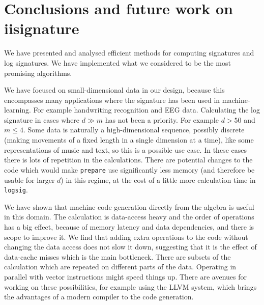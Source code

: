 \section{Conclusions and future work on iisignature}
\label{sec:iisigConcl}

We have presented and analysed efficient methods for computing signatures and log signatures. %
We have implemented what we considered to be the most promising algorithms.

We have focused on small-dimensional data in our design, because this encompasses many applications where the signature has been used in machine-learning. For example handwriting recognition and EEG data.
Calculating the log signature in cases where $d\gg m$ has not been a priority. For example $d>50$ and $m\le4$. Some data is naturally a high-dimensional sequence, possibly discrete (making movements of a fixed length in a single dimension at a time), like some representations of music and text, so this is a possible use case. In these cases there is lots of repetition in the calculations. There are potential changes to the code which would make \verb|prepare| use significantly less memory (and therefore be usable for larger $d$) in this regime, at the cost of a little more calculation time in \verb|logsig|.

We have shown that machine code generation directly from the algebra is useful in this domain.
The calculation is data-access heavy and the order of operations has a big effect, because of memory latency and data dependencies, and there is scope to improve it. We find that adding extra operations to the code without changing the data access does not slow it down, suggesting that it is the effect of data-cache misses which is the main bottleneck. There are subsets of the calculation which are repeated on different parts of the data. Operating in parallel with vector instructions might speed things up.
There are avenues for working on these possibilities, for example using the LLVM system, which brings the advantages of a modern compiler to the code generation. 
\endDocumentJR